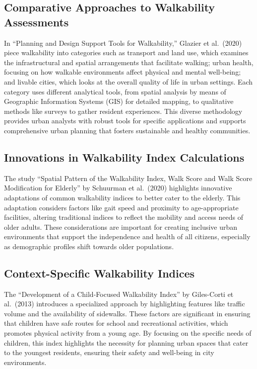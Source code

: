 \documentclass[
]{article}
\begin{document}
\subsection{Comparative Approaches to Walkability
Assessments}\label{comparative-approaches-to-walkability-assessments}

In ``Planning and Design Support Tools for Walkability,'' Glazier et
al.~(2020) piece walkability into categories such as transport and land
use, which examines the infrastructural and spatial arrangements that
facilitate walking; urban health, focusing on how walkable environments
affect physical and mental well-being; and livable cities, which looks
at the overall quality of life in urban settings. Each category uses
different analytical tools, from spatial analysis by means of Geographic
Information Systems (GIS) for detailed mapping, to qualitative methods
like surveys to gather resident experiences. This diverse methodology
provides urban analysts with robust tools for specific applications and
supports comprehensive urban planning that fosters sustainable and
healthy communities.

\subsection{Innovations in Walkability Index
Calculations}\label{innovations-in-walkability-index-calculations}

The study ``Spatial Pattern of the Walkability Index, Walk Score and
Walk Score Modification for Elderly'' by Schuurman et al.~(2020)
highlights innovative adaptations of common walkability indices to
better cater to the elderly. This adaptation considers factors like gait
speed and proximity to age-appropriate facilities, altering traditional
indices to reflect the mobility and access needs of older adults. These
considerations are important for creating inclusive urban environments
that support the independence and health of all citizens, especially as
demographic profiles shift towards older populations.

\subsection{Context-Specific Walkability
Indices}\label{context-specific-walkability-indices}

The ``Development of a Child-Focused Walkability Index'' by Giles-Corti
et al.~(2013) introduces a specialized approach by highlighting features
like traffic volume and the availability of sidewalks. These factors are
significant in ensuring that children have safe routes for school and
recreational activities, which promotes physical activity from a young
age. By focusing on the specific needs of children, this index
highlights the necessity for planning urban spaces that cater to the
youngest residents, ensuring their safety and well-being in city
environments.
\end{document}

